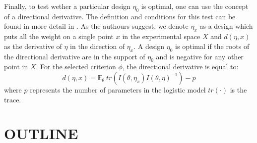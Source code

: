 \documentclass[preprint,review,12pt]{elsarticle}
\begin{document}
Finally, to test wether a particular design $\eta_0$ is optimal, one can use the concept of a directional derivative. The definition and conditions for this test can be found in more detail in \citet{chalar1989}. As the authours suggest, we denote $\eta_x$ as a design which puts all the weight on a single point $x$ in the experimental space $X$ and $d(\eta,x)$ as the derivative of $\eta$ in the direction of $\eta_x$. A design $\eta_0$ is optimal if the roots of the directional derivative are in the support of $\eta_0$ and is negative for any other point in $X$. For the selected criterion $\phi$, the directional derivative is equal to:
\begin{equation}
d(\eta,x)=\mathbb{E}_\theta\ tr \left( I(\theta,\eta_x) I(\theta,\eta)^{-1}\right)-p
\end{equation}
where $p$ represents the number of parameters in the logistic model $tr(\cdot)$ is the trace.




% 

\section{OUTLINE}



\end{document}
